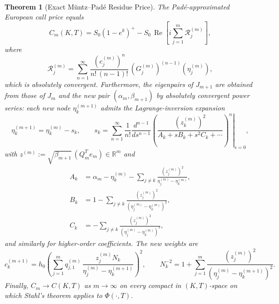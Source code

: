 \documentclass{article}
\newtheorem{theorem}{Theorem}
\newcommand{\R}{\mathbb{R}}
\newcommand{\cR}{\mathcal{R}}
\begin{document}
\begin{theorem}[Exact M\"untz--Pad\'e Residue Price]\label{thm:main}
The Pad\'e-approximated European call price equals
\begin{equation}\label{eq:price}
  C_m(K,T) = S_0(1 - e^k)^+ - S_0\,\operatorname{Re}\!\left[
    i\sum_{j=1}^{m} \cR_j^{(m)}\right],
\end{equation}
where
\begin{equation}\label{eq:Rj}
  \cR_j^{(m)} = \sum_{n=1}^{\infty}
    \frac{(c_j^{(m)})^n}{n!\,(n-1)!}\,(G_j^{(m)})^{(n-1)}(\eta_j^{(m)}),
\end{equation}
which is absolutely convergent.  Furthermore, the eigenpairs of
$J_{m+1}$ are obtained from those of $J_m$ and the new pair
$(\alpha_m,\beta_{m+1})$ by absolutely convergent power series: each
new node $\eta_k^{(m+1)}$ admits the Lagrange-inversion expansion
\begin{equation}\label{eq:node_update}
  \eta_k^{(m+1)} = \eta_k^{(m)} - s_k,\qquad
  s_k = \sum_{n=1}^{\infty}\frac{1}{n!}\left.\frac{d^{n-1}}{ds^{n-1}}
    \!\left(\frac{(z_k^{(m)})^2}{A_k + sB_k + s^2C_k + \cdots}\right)^{\!n}
  \right|_{s=0},
\end{equation}
with $z^{(m)} := \sqrt{\beta_{m+1}}\,(Q_m^T e_m) \in \R^m$ and
\begin{align}
  A_k &= \alpha_m - \eta_k^{(m)}
    - \sum_{j\ne k}\frac{(z_j^{(m)})^2}{\eta_j^{(m)} - \eta_k^{(m)}},
    \label{eq:Ak}\\
  B_k &= 1 - \sum_{j\ne k}
    \frac{(z_j^{(m)})^2}{(\eta_j^{(m)} - \eta_k^{(m)})^2},
    \label{eq:Bk}\\
  C_k &= -\sum_{j\ne k}
    \frac{(z_j^{(m)})^2}{(\eta_j^{(m)} - \eta_k^{(m)})^3},
    \label{eq:Ck}
\end{align}
and similarly for higher-order coefficients.  The new weights are
\begin{equation}\label{eq:new_weight}
  c_k^{(m+1)} = h_0\left(\sum_{j=1}^m q_{j,1}^{(m)}\,
    \frac{z_j^{(m)} N_k}{\eta_j^{(m)} - \eta_k^{(m+1)}}\right)^{\!2},
  \qquad
  N_k^{-2} = 1 + \sum_{j=1}^m
    \frac{(z_j^{(m)})^2}{(\eta_j^{(m)} - \eta_k^{(m+1)})^2}.
\end{equation}
Finally, $C_m \to C(K,T)$ as $m\to\infty$ on every compact in
$(K,T)$-space on which Stahl's theorem applies to $\Phi(\cdot,T)$.
\end{theorem}
\end{document}
